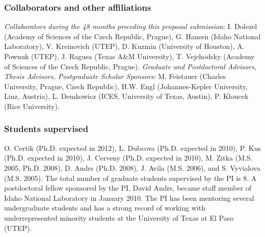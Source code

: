 \documentclass[11pt,letterpaper]{article}
\begin{document}
\subsubsection*{Collaborators and other affiliations}

{\em Collaborators during the 48 months preceding this proposal submission}:
I. Dolezel (Academy of Sciences of the Czech Republic, Prague),
G. Hansen (Idaho National Laboratory),
V. Kreinovich (UTEP), 
D. Kuzmin (University of Houston), 
A. Pownuk (UTEP),
J. Ragusa (Texas A\&M University), 
T. Vejchodsky (Academy of Sciences of the Czech Republic, Prague).
{\em Graduate and Postdoctoral Advisors, Thesis Advisors, 
Postgraduate Scholar Sponsors}:
M. Feistauer (Charles University, Prague, Czech Republic),
H.W. Engl (Johannes-Kepler University, Linz, Austria),
L. Demkowicz (ICES, University of Texas, Austin),
P. Kloucek (Rice University).

\subsubsection*{Students supervised}

O. Certik (Ph.D. expected in 2012), 
L. Dubcova (Ph.D. expected in 2010), 
P. Kus (Ph.D. expected in 2010), 
J. Cerveny (Ph.D. expected in 2010), 
M. Zitka (M.S. 2005, Ph.D. 2008), 
D. Andrs (Ph.D. 2008), 
J. Avila (M.S. 2006), and
S. Vyvialova (M.S. 2005). The total number of 
graduate students supervised by the PI is 8.
A postdoctoral fellow sponsored by the PI, David Andrs,  
became staff member of Idaho National Laboratory in January 2010. 
The PI has been mentoring several undergraduate students and 
has a strong record of working with underrepresented 
minority students at the University of Texas at El Paso (UTEP). 


\end{document}
